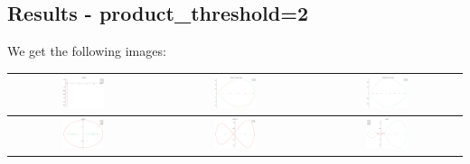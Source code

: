 \documentclass[a4paper,10pt]{article}
\begin{document}
 \subsection{Results - product\_threshold=2}
 We get the following images:
 \begin{table}[!ht]
 \begin{tabular}{|c|c|c|}
  \hline
  \includegraphics[width=0.3\textwidth]{PT_2_z1.png} &
  \includegraphics[width=0.3\textwidth]{PT_2_C1z1.png} &
  \includegraphics[width=0.3\textwidth]{PT_2_C2z1.png} \\ \hline
  \includegraphics[width=0.3\textwidth]{PT_2_z2.png} &
  \includegraphics[width=0.3\textwidth]{PT_2_zed_C0.png} &
  \includegraphics[width=0.3\textwidth]{PT_2_zed.png} \\ \hline
 \end{tabular}
 \end{table}
\end{document}
